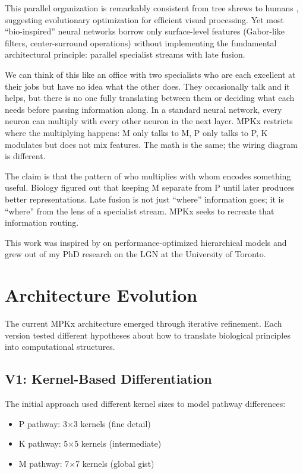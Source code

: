 \documentclass{article}
\begin{document}
This parallel organization is remarkably consistent from tree shrews to humans \citep{conley1984}, suggesting evolutionary optimization for efficient visual processing. Yet most ``bio-inspired'' neural networks borrow only surface-level features (Gabor-like filters, center-surround operations) without implementing the fundamental architectural principle: parallel specialist streams with late fusion.

We can think of this like an office with two specialists who are each excellent at their jobs but have no idea what the other does. They occasionally talk and it helps, but there is no one fully translating between them or deciding what each needs before passing information along. In a standard neural network, every neuron can multiply with every other neuron in the next layer. MPKx restricts where the multiplying happens: M only talks to M, P only talks to P, K modulates but does not mix features. The math is the same; the wiring diagram is different.

The claim is that the pattern of who multiplies with whom encodes something useful. Biology figured out that keeping M separate from P until later produces better representations. Late fusion is not just ``where'' information goes; it is ``where'' from the lens of a specialist stream. MPKx seeks to recreate that information routing.

This work was inspired by \citet{yamins2014} on performance-optimized hierarchical models and grew out of my PhD research on the LGN at the University of Toronto.

\section{Architecture Evolution}

The current MPKx architecture emerged through iterative refinement. Each version tested different hypotheses about how to translate biological principles into computational structures.

\subsection{V1: Kernel-Based Differentiation}

The initial approach used different kernel sizes to model pathway differences:
\begin{itemize}
    \item P pathway: 3$\times$3 kernels (fine detail)
    \item K pathway: 5$\times$5 kernels (intermediate)
    \item M pathway: 7$\times$7 kernels (global gist)
\end{itemize}
\end{document}
